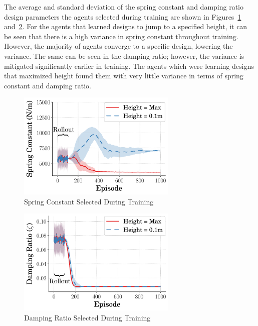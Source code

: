 \documentclass[10pt,twocolumn,letterpaper]{article}
\begin{document}
The average and standard deviation of the spring constant and damping ratio design parameters the agents selected during training are shown in Figures~\ref{fig:spring_vs_step_far} and~\ref{fig:zeta_vs_step_far}. For the agents that learned designs to jump to a specified height, it can be seen that there is a high variance in spring constant throughout training. However, the majority of agents converge to a specific design, lowering the variance. The same can be seen in the damping ratio; however, the variance is mitigated significantly earlier in training. The agents which were learning designs that maximized height found them with very little variance in terms of spring constant and damping ratio. 

%
\begin{figure}[tb]
        \begin{center}
        \includegraphics[width = 3in]{figures/design_space_wide/SpringVsTime.png}  
        \caption{Spring Constant Selected During Training}
        \label{fig:spring_vs_step_far}
        \end{center}
        \end{figure}
%
\begin{figure}[tb]
        \begin{center}
        \includegraphics[width = 3in]{figures/design_space_wide/ZetaVsTime.png}  
        \caption{Damping Ratio Selected During Training}
        \label{fig:zeta_vs_step_far}
        \end{center}
        \end{figure}
\end{document}
